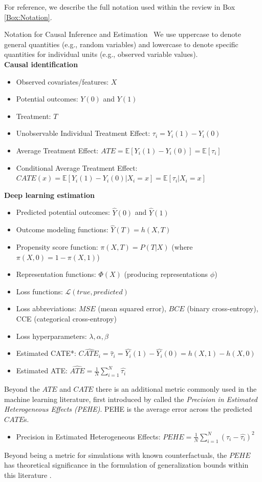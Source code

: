 For reference, we describe the full notation used within the review in Box \ref{Box:Notation}.
\begin{TCBBox}[label=Box:Notation]{Notation for Causal Inference and Estimation}
\
 We use uppercase to denote general quantities (e.g., random variables) and lowercase to denote specific quantities for individual units (e.g., observed variable values).
\\
\textbf{Causal identification}
\begin{small}
\begin{itemize}
\item Observed covariates/features: $X$
\item Potential outcomes: $Y(0)$ and $Y(1)$
\item Treatment: $T$
\item Unobservable Individual Treatment Effect: $\tau_i=Y_i(1)-Y_i(0)$
\item Average Treatment Effect: $ATE =\mathbb{E}[Y_i(1)-Y_i(0)] = \mathbb{E}[\tau_i]$
\item Conditional Average Treatment Effect: $CATE(x) =\mathbb{E}[Y_i(1)-Y_i(0)|X_i=x] = \mathbb{E}[\tau_i|X_i=x]$
\end{itemize}
\end{small}
\textbf{Deep learning estimation}
\begin{small}
\begin{itemize}
\item Predicted potential outcomes: $\hat{Y}(0)$ and $\hat{Y}(1)$
\item Outcome modeling functions: $\hat{Y}(T)=h(X,T)$ 
\item Propensity score function: $\pi(X,T)=P(T|X)$ (where $\pi(X,0)=1-\pi(X,1)$)
\item Representation functions: $\Phi(X)$ (producing representations $\phi$)
\item Loss functions: $\mathcal{L}(true,predicted)$
\item Loss abbreviations: $MSE$ (mean squared error), $BCE$ (binary cross-entropy),
CCE (categorical cross-entropy)
\item Loss hyperparameters: $\lambda,\alpha,\beta$
\item Estimated CATE*: $\hat{CATE_i} = \hat{\tau}_i = \hat{Y_i}(1)-\hat{Y_i}(0) = h(X,1)-h(X,0)$
\item Estimated ATE: $\hat{ATE}=\frac{1}{N}\sum_{i=1}^N\hat{\tau_i}$
\end{itemize}
\end{small}
Beyond the $ATE$ and $CATE$ there is an additional metric commonly used in the machine learning literature, first introduced by \citet{Hill2011} called the \textit{Precision in Estimated Heterogeneous Effects (PEHE)}. PEHE is the average error across the predicted $CATE$s.
\begin{itemize}
\small \item Precision in Estimated Heterogeneous Effects: $PEHE=\frac{1}{N}\sum_{i=1}^N(\tau_i-\hat{\tau_i})^2$
\end{itemize}
Beyond being a metric for simulations with known counterfactuals, the $PEHE$ has theoretical significance in the formulation of generalization bounds within this literature \citep{Shalit2017,Johansson2018,johannson2020,zhang2020learning}.


\end{TCBBox}
